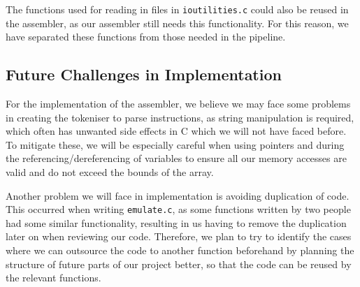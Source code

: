 \documentclass[11pt]{article}
\begin{document}
The functions used for reading in files in \texttt{ioutilities.c} could also be reused in the assembler, as our assembler still needs this functionality. For this reason, we have separated these functions from those needed in the pipeline.

\subsection{Future Challenges in Implementation}

For the implementation of the assembler, we believe we may face some problems in creating the tokeniser to parse instructions, as string manipulation is required, which often has unwanted side effects in C which we will not have faced before. To mitigate these, we will be especially careful when using pointers and during the referencing/dereferencing of variables to ensure all our memory accesses are valid and do not exceed the bounds of the array.

Another problem we will face in implementation is avoiding duplication of code. This occurred when writing \texttt{emulate.c}, as some functions written by two people had some similar functionality, resulting in us having to remove the duplication later on when reviewing our code. Therefore, we plan to try to identify the cases where we can outsource the code to another function beforehand by planning the structure of future parts of our project better, so that the code can be reused by the relevant functions.

\end{document}
